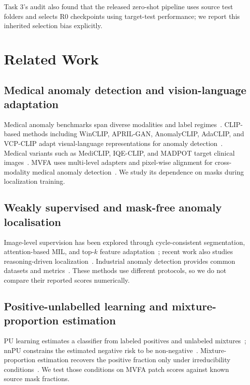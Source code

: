 \documentclass[10pt,twocolumn,letterpaper]{article}
\begin{document}
Task 3's audit also found that the released zero-shot pipeline uses source test folders and selects R0 checkpoints using target-test performance; we report this inherited selection bias explicitly.

\section{Related Work}
\label{sec:related}
\subsection{Medical anomaly detection and vision-language adaptation}
Medical anomaly benchmarks span diverse modalities and label regimes~\cite{medicalad_survey2021,bmad2024}. CLIP-based methods including WinCLIP, APRIL-GAN, AnomalyCLIP, AdaCLIP, and VCP-CLIP adapt visual-language representations for anomaly detection~\cite{winclip2023,aprilgan2023,anomalyclip2023,adaclip2024,vcpclip2024}. Medical variants such as MediCLIP, IQE-CLIP, and MADPOT target clinical images~\cite{mediclip2024,iqeclip2026,madpot2026}. MVFA uses multi-level adapters and pixel-wise alignment for cross-modality medical anomaly detection~\cite{huang2024mvfa}. We study its dependence on masks during localization training.

\subsection{Weakly supervised and mask-free anomaly localisation}
Image-level supervision has been explored through cycle-consistent segmentation, attention-based MIL, and top-$k$ feature adaptation~\cite{cycle_seg2021,ilse2018attentionmil,adfa2023}; recent work also studies reasoning-driven localization~\cite{imagelevel2026}. Industrial anomaly detection provides common datasets and metrics~\cite{mvtec2019}. These methods use different protocols, so we do not compare their reported scores numerically.

\subsection{Positive-unlabelled learning and mixture-proportion estimation}
PU learning estimates a classifier from labeled positives and unlabeled mixtures~\cite{elkan2008pu}; nnPU constrains the estimated negative risk to be non-negative~\cite{kiryo2017nnpu}. Mixture-proportion estimation recovers the positive fraction only under irreducibility conditions~\cite{ramaswamy2016mpe}. We test those conditions on MVFA patch scores against known source mask fractions.
\end{document}
